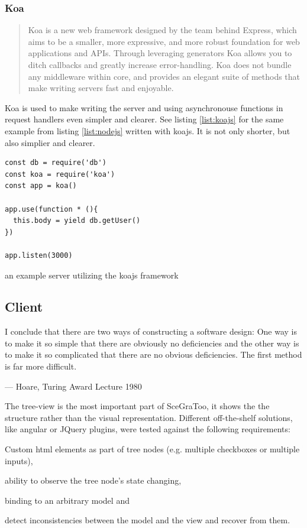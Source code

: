 \subsubsection{Koa}
\label{par:Koa}
\begin{quote}
  Koa is a new web framework designed by the team behind Express, which aims to be a smaller, more expressive, and more robust foundation for web applications and APIs. Through leveraging generators Koa allows you to ditch callbacks and greatly increase error-handling. Koa does not bundle any middleware within core, and provides an elegant suite of methods that make writing servers fast and enjoyable. \cite{koajs}
\end{quote}

Koa is used to make writing the server and using asynchronouse functions in request handlers even simpler and clearer.
See listing \ref{list:koajs} for the same example from listing \ref{list:nodejs} written with koajs.
It is not only shorter, but also simplier and clearer.

\begin{listing}
  \begin{verbatim}
const db = require('db')
const koa = require('koa')
const app = koa()

app.use(function * (){
  this.body = yield db.getUser()
})

app.listen(3000)
  \end{verbatim}
  \caption{an example server utilizing the koajs framework}
  \label{list:koajs}
\end{listing}

\subsection{Client}
\label{client}

\epigraph{I conclude that there are two ways of constructing a software design:
One way is to make it so simple that there are obviously no deficiencies
and the other way is to make it so complicated that there are no obvious
deficiencies. The first method is far more difficult.}{--- Hoare, Turing Award Lecture 1980}

The tree-view is the most important part of SceGraToo, it shows the
the structure rather than the visual representation. Different
off-the-shelf solutions, like angular or JQuery plugins, were tested
against the following requirements:

\begin{enumerate*}
  \item Custom html elements as part of tree nodes (e.g. multiple checkboxes or multiple inputs),
  \item ability to observe the tree node's state changing,
  \item binding to an arbitrary model and
  \item detect inconsistencies between the model and the view and recover from them.
\end{enumerate*}

